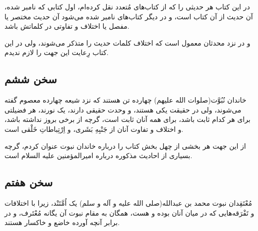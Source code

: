 در این کتاب هر حدیثی را که از کتاب‌های مُتعدد نقل کرده‌ام، اول کتابی که
نامبر شده، آن حدیث از آن کتاب است، و در دیگر کتاب‌های نامبر شده می‌شود
آن حدیث مختصر یا مفصل یا اختلاف و تفاوتی در کلماتش باشد.

و در نزد محدثان معمول است که اختلاف کلمات حدیث را متذکر می‌شوند، ولی در
این کتاب رِعایت این جهت را لازم ندیدم.

\subsection*{سخن ششم}

خاندان نُبُوَّت(صلوات الله علیهم) چهارده تن هستند که نزد شیعه چهارده معصوم
گفته می‌شوند، ولی در حقیقت یکی هستند، و وحدت حقیقی دارند، یک نورند، هر
فضیلتی برای هر کدام ثابت باشد، برای همه آنان ثابت است، گرچه از برخی
بروز نداشته باشد، و اختلاف و تفاوت آنان از جَنْبِهِ بَشَری، و اِرْتِباطاتِ خَلْقی
است.

از این جهت هر بخشی از چهل بخش کتاب را درباره خاندان نبوت عنوان کردم،
گرچه بسیاری از احادیث مذکوره درباره امیرالمؤمنین علیه السلام است.

\subsection*{سخن هفتم}

مُعْتَقِدان نبوت محمد بن عبدالله(صلی الله علیه و آله و سلم) یک اُمَّتَنْد، زیرا
با اختلافات و تَفْرَقه‌هایی که در میان آنان بوده و هست، همگان به مقام نبوت
آن یگانه مُعْتَرف، و در برابر آنچه آورده خاضع و خاکسار هستند.

